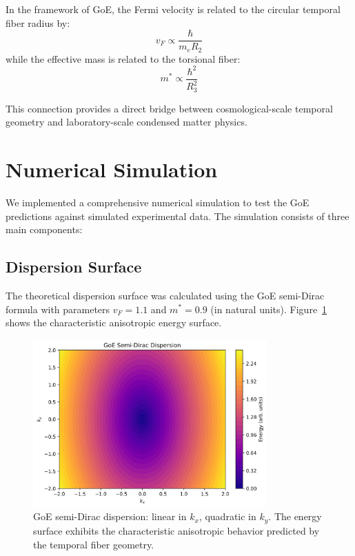\documentclass[12pt]{article}
\begin{document}
In the framework of GoE, the Fermi velocity is related to the circular temporal fiber radius by:
\begin{equation}
    v_F \propto \frac{\hbar}{m_e R_2}
\end{equation}
while the effective mass is related to the torsional fiber:
\begin{equation}
    m^* \propto \frac{\hbar^2}{R_3^2}
\end{equation}

This connection provides a direct bridge between cosmological-scale temporal geometry and laboratory-scale condensed matter physics.

\section{Numerical Simulation}

We implemented a comprehensive numerical simulation to test the GoE predictions against simulated experimental data. The simulation consists of three main components:

\subsection{Dispersion Surface}

The theoretical dispersion surface was calculated using the GoE semi-Dirac formula with parameters $v_F = 1.1$ and $m^* = 0.9$ (in natural units). Figure~\ref{fig:dispersion} shows the characteristic anisotropic energy surface.

\begin{figure}[H]
    \centering
    \includegraphics[width=0.8\textwidth]{goe_dispersion.png}
    \caption{GoE semi-Dirac dispersion: linear in $k_x$, quadratic in $k_y$. The energy surface exhibits the characteristic anisotropic behavior predicted by the temporal fiber geometry.}
    \label{fig:dispersion}
\end{figure}
\end{document}
